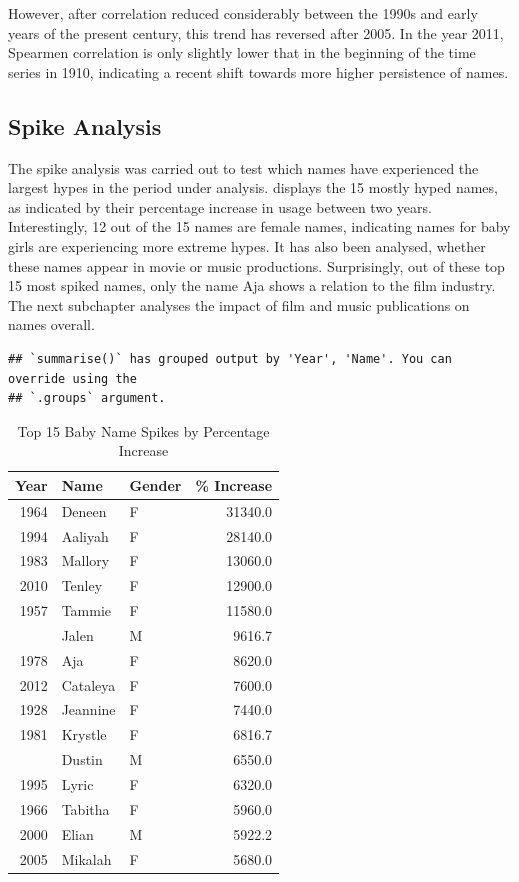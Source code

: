 \documentclass[11pt,preprint]{elsarticle}
\numberwithin{equation}{section}
\numberwithin{figure}{section}
\numberwithin{table}{section}
\begin{document}
However, after correlation reduced considerably between the 1990s and
early years of the present century, this trend has reversed after 2005.
In the year 2011, Spearmen correlation is only slightly lower that in
the beginning of the time series in 1910, indicating a recent shift
towards more higher persistence of names.

\subsection{Spike Analysis}\label{spike-analysis}

The spike analysis was carried out to test which names have experienced
the largest hypes in the period under analysis.
\textcite{tbl-top-spikes} displays the 15 mostly hyped names, as
indicated by their percentage increase in usage between two years.
Interestingly, 12 out of the 15 names are female names, indicating names
for baby girls are experiencing more extreme hypes. It has also been
analysed, whether these names appear in movie or music productions.
Surprisingly, out of these top 15 most spiked names, only the name Aja
shows a relation to the film industry. The next subchapter analyses the
impact of film and music publications on names overall.

\begin{verbatim}
## `summarise()` has grouped output by 'Year', 'Name'. You can override using the
## `.groups` argument.
\end{verbatim}

\begin{longtable}[t]{rllr}
\caption{\label{tab:top-spikes}Top 15 Baby Name Spikes by Percentage Increase}\\
\toprule
Year & Name & Gender & \% Increase\\
\midrule
1964 & Deneen & F & 31340.0\\
1994 & Aaliyah & F & 28140.0\\
1983 & Mallory & F & 13060.0\\
2010 & Tenley & F & 12900.0\\
1957 & Tammie & F & 11580.0\\
\addlinespace
1992 & Jalen & M & 9616.7\\
1978 & Aja & F & 8620.0\\
2012 & Cataleya & F & 7600.0\\
1928 & Jeannine & F & 7440.0\\
1981 & Krystle & F & 6816.7\\
\addlinespace
1968 & Dustin & M & 6550.0\\
1995 & Lyric & F & 6320.0\\
1966 & Tabitha & F & 5960.0\\
2000 & Elian & M & 5922.2\\
2005 & Mikalah & F & 5680.0\\
\bottomrule
\end{longtable}
\end{document}
